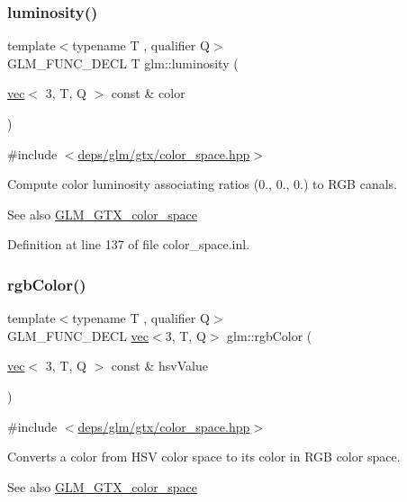 \subsubsection{\texorpdfstring{luminosity()}{luminosity()}}
{\footnotesize\ttfamily template$<$typename T , qualifier Q$>$ \\
G\+L\+M\+\_\+\+F\+U\+N\+C\+\_\+\+D\+E\+CL T glm\+::luminosity (\begin{DoxyParamCaption}\item[{\hyperlink{structglm_1_1vec}{vec}$<$ 3, T, Q $>$ const \&}]{color }\end{DoxyParamCaption})}



{\ttfamily \#include $<$\hyperlink{gtx_2color__space_8hpp}{deps/glm/gtx/color\+\_\+space.\+hpp}$>$}

Compute color luminosity associating ratios (0., 0., 0.) to R\+GB canals. \begin{DoxySeeAlso}{See also}
\hyperlink{group__gtx__color__space}{G\+L\+M\+\_\+\+G\+T\+X\+\_\+color\+\_\+space} 
\end{DoxySeeAlso}


Definition at line 137 of file color\+\_\+space.\+inl.

\mbox{\label{group__gtx__color__space_ga5f9193be46f45f0655c05a0cdca006db}} 
\subsubsection{\texorpdfstring{rgb\+Color()}{rgbColor()}}
{\footnotesize\ttfamily template$<$typename T , qualifier Q$>$ \\
G\+L\+M\+\_\+\+F\+U\+N\+C\+\_\+\+D\+E\+CL \hyperlink{structglm_1_1vec}{vec}$<$3, T, Q$>$ glm\+::rgb\+Color (\begin{DoxyParamCaption}\item[{\hyperlink{structglm_1_1vec}{vec}$<$ 3, T, Q $>$ const \&}]{hsv\+Value }\end{DoxyParamCaption})}



{\ttfamily \#include $<$\hyperlink{gtx_2color__space_8hpp}{deps/glm/gtx/color\+\_\+space.\+hpp}$>$}

Converts a color from H\+SV color space to its color in R\+GB color space. \begin{DoxySeeAlso}{See also}
\hyperlink{group__gtx__color__space}{G\+L\+M\+\_\+\+G\+T\+X\+\_\+color\+\_\+space} 
\end{DoxySeeAlso}


